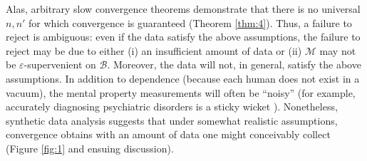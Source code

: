 \documentclass{article}
\providecommand{\mc}[1]{\mathcal{#1}}
\newcommand{\eps}{\varepsilon}
\begin{document}
Alas, arbitrary slow convergence theorems demonstrate that there is no universal $n,n'$ for which convergence is guaranteed (Theorem \ref{thm:4}).  Thus, a failure to reject is ambiguous: even if the data satisfy the above assumptions, the failure to reject may be due to either (i) an insufficient amount of data or (ii) $\mc{M}$ may not be $\eps$-supervenient on $\mc{B}$.  Moreover, the data will not, in general, satisfy the above assumptions.  In addition to dependence (because each human does not exist in a vacuum), the mental property measurements will often be ``noisy'' (for example, accurately diagnosing psychiatric disorders is a sticky wicket \cite{Kessler2005}). 
% 
Nonetheless, synthetic data analysis suggests that under somewhat realistic assumptions, convergence obtains with an amount of data one might conceivably collect (Figure \ref{fig:1} and ensuing discussion).  


 


\end{document}
